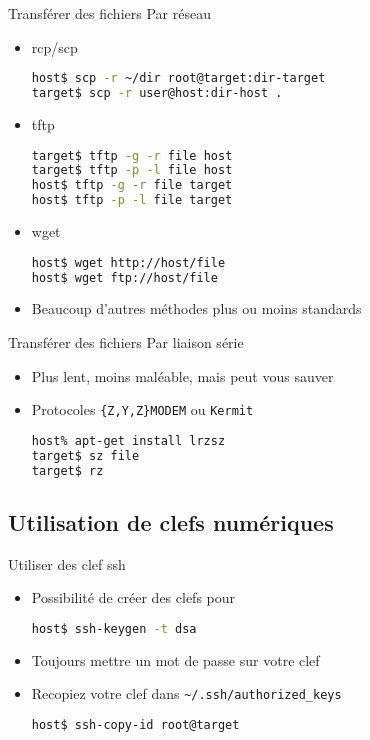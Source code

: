 \begin{frame}[fragile=singleslide]{Transférer des fichiers}
  Par réseau
  \begin{itemize}
  \item rcp/scp
\begin{lstlisting}[language=sh]
host$ scp -r ~/dir root@target:dir-target
target$ scp -r user@host:dir-host .
\end{lstlisting} %
  \item tftp
\begin{lstlisting}[language=sh]
target$ tftp -g -r file host
target$ tftp -p -l file host
host$ tftp -g -r file target
host$ tftp -p -l file target
\end{lstlisting} %
  \item wget
\begin{lstlisting}[language=sh]
host$ wget http://host/file
host$ wget ftp://host/file
\end{lstlisting} %
  \item Beaucoup d'autres méthodes plus ou moins standards
  \end{itemize}
\end{frame}

\begin{frame}[fragile=singleslide]{Transférer des fichiers}
  Par liaison série
  \begin{itemize}
  \item Plus lent, moins maléable, mais peut vous sauver
  \item Protocoles \verb+{Z,Y,Z}MODEM+ ou \verb+Kermit+
\begin{lstlisting}[language=sh]
host% apt-get install lrzsz 
target$ sz file
target$ rz
\end{lstlisting} %
  \end{itemize}
\end{frame}

\subsection{Utilisation de clefs numériques}

\begin{frame}[fragile=singleslide]{Utiliser des clef ssh}
  \begin{itemize}
  \item Possibilité de créer des clefs pour 
\begin{lstlisting}[language=sh]
host$ ssh-keygen -t dsa
\end{lstlisting} %
  \item Toujours mettre un mot de passe sur votre clef
  \item Recopiez votre clef dans \verb+~/.ssh/authorized_keys+
\begin{lstlisting}[language=sh]
host$ ssh-copy-id root@target
\end{lstlisting} %
  \end{itemize}
\end{frame}

